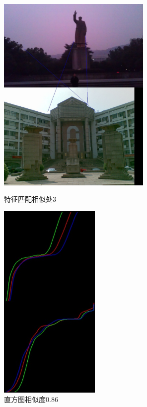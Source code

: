 \begin{figure}[htb]
\begin{minipage}[t]{0.5\linewidth}
\centering
\includegraphics[height=3.8in]{玉泉毛像.jpg.d/im5sift.jpg}
\caption{特征匹配相似处3}
\label{fig:side:a}
\end{minipage}%
\begin{minipage}[t]{0.5\linewidth}
\centering
\includegraphics[height=3.8in]{玉泉毛像.jpg.d/im5hist2.jpg}
\caption{直方图相似度0.86}
\label{fig:side:a}
\end{minipage}%
\end{figure}

\clearpage
